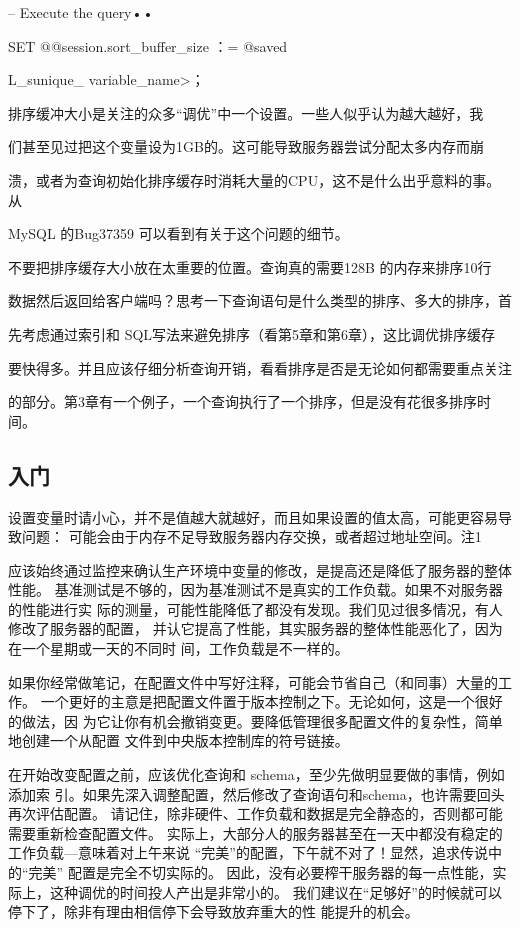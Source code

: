 -- Execute the query••

SET @@session.sort\_buffer\_size ：= @saved

L\_sunique\_ variable\_name>；

排序缓冲大小是关注的众多“调优”中一个设置。一些人似乎认为越大越好，我

们甚至见过把这个变量设为1GB的。这可能导致服务器尝试分配太多内存而崩

溃，或者为查询初始化排序缓存时消耗大量的CPU，这不是什么出乎意料的事。从

MySQL 的Bug37359 可以看到有关于这个问题的细节。

不要把排序缓存大小放在太重要的位置。查询真的需要128B 的内存来排序10行

数据然后返回给客户端吗？思考一下查询语句是什么类型的排序、多大的排序，首

先考虑通过索引和 SQL写法来避免排序（看第5章和第6章），这比调优排序缓存

要快得多。并且应该仔细分析查询开销，看看排序是否是无论如何都需要重点关注

的部分。第3章有一个例子，一个查询执行了一个排序，但是没有花很多排序时间。

\subsection{入门}
设置变量时请小心，并不是值越大就越好，而且如果设置的值太高，可能更容易导致问题：
可能会由于内存不足导致服务器内存交换，或者超过地址空间。注1

应该始终通过监控来确认生产环境中变量的修改，是提高还是降低了服务器的整体性能。
基准测试是不够的，因为基准测试不是真实的工作负载。如果不对服务器的性能进行实
际的测量，可能性能降低了都没有发现。我们见过很多情况，有人修改了服务器的配置，
并认它提高了性能，其实服务器的整体性能恶化了，因为在一个星期或一天的不同时
间，工作负载是不一样的。

如果你经常做笔记，在配置文件中写好注释，可能会节省自己（和同事）大量的工作。
一个更好的主意是把配置文件置于版本控制之下。无论如何，这是一个很好的做法，因
为它让你有机会撤销变更。要降低管理很多配置文件的复杂性，简单地创建一个从配置
文件到中央版本控制库的符号链接。

在开始改变配置之前，应该优化查询和 schema，至少先做明显要做的事情，例如添加索
引。如果先深入调整配置，然后修改了查询语句和schema，也许需要回头再次评估配置。
请记住，除非硬件、工作负载和数据是完全静态的，否则都可能需要重新检查配置文件。
实际上，大部分人的服务器甚至在一天中都没有稳定的工作负载—意味着对上午来说
“完美”的配置，下午就不对了！显然，追求传说中的“完美” 配置是完全不切实际的。
因此，没有必要榨干服务器的每一点性能，实际上，这种调优的时间投人产出是非常小的。
我们建议在“足够好”的时候就可以停下了，除非有理由相信停下会导致放弃重大的性
能提升的机会。

